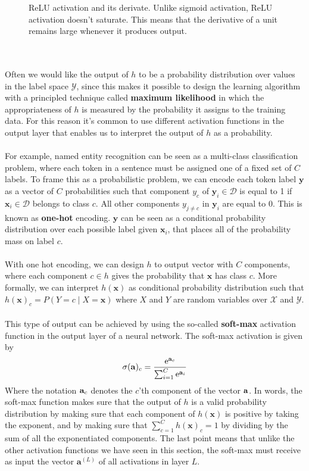 \begin{figure}
	\centering
	
	\caption{ReLU activation and its derivate. Unlike sigmoid activation, ReLU activation doesn't saturate. This means that the derivative of a unit remains large whenever it produces output.}
	\label{relu}
\end{figure}
\\\\
Often we would like the output of $h$ to be a probability distribution over values in the label space $\mathcal{Y}$, since this makes it possible to design the learning algorithm with a principled technique called \textbf{maximum likelihood} in which the appropriateness of $h$ is measured by the probability it assigns to the training data. For this reason it's common to use different activation functions in the output layer that enables us to interpret the output of $h$ as a probability. 
\\\\
For example, named entity recognition can be seen as a multi-class classification problem, where each token in a sentence must be assigned one of a fixed set of $C$ labels. To frame this as a probabilistic problem, we can encode each token label $\mathbf{y}$ as a vector of $C$ probabilities such that component $y_c$ of $\mathbf{y}_i \in \mathcal{D}$ is equal to 1 if $\mathbf{x}_i \in \mathcal{D}$ belongs to class $c$. All other components $y_{j\neq c}$ in $\mathbf{y}_i$ are equal to 0. This is known as \textbf{one-hot} encoding. $\mathbf{y}$ can be seen as a conditional probability distribution over each possible label given $\mathbf{x}_i$, that places all of the probability mass on label $c$.
\\\\
With one hot encoding, we can design $h$ to output vector with $C$ components, where each component $c \in h$ gives the probability that $\mathbf{x}$ has class $c$. More formally, we can interpret $h(\mathbf{x})$ as conditional probability distribution such that $h(\mathbf{x})_c = P(Y = c \mid X = \mathbf{x})$ where $X$ and $Y$ are random variables over $\mathcal{X}$ and $\mathcal{Y}$.
\\\\
This type of output can be achieved by using the so-called \textbf{soft-max} activation function in the output layer of a neural network. The soft-max activation is given by 
$$
\sigma(\mathbf{a})_c = \frac{\mathrm{e}^{\mathbf{a}_c}}{\sum_{i = 1}^C \mathrm{e}^{\mathbf{a}_i}}
$$ 
Where the notation $\mathbf{a}_c$ denotes the $c$'th component of the vector $\mathbf{a}$. In words, the soft-max function makes sure that the output of $h$ is a valid probability distribution by making sure that each component of $h(\mathbf{x})$ is positive by taking the exponent, and by making sure that $\sum_{c=1}^Ch(\mathbf{x})_c = 1$ by dividing by the sum of all the exponentiated components. The last point means that unlike the other activation functions we have seen in this section, the soft-max must receive as input the vector $\mathbf{a}^{(L)}$ of all activations in layer $L$.
